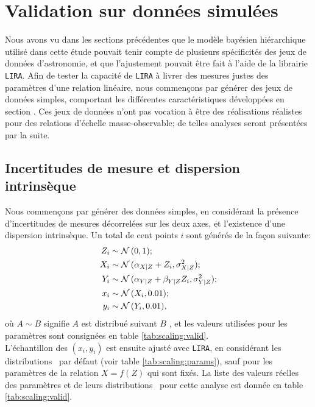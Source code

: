 \section{Validation sur données simulées}
\label{sec:scaling:valid}

Nous avons vu dans les sections précédentes que le modèle bayésien hiérarchique utilisé dans cette étude pouvait tenir compte de plusieurs spécificités des jeux de données d'astronomie, et que l'ajustement pouvait être fait à l'aide de la librairie \texttt{LIRA}.
Afin de tester la capacité de \texttt{LIRA} à livrer des mesures justes des paramètres d'une relation linéaire, nous commençons par générer des jeux de données simples, comportant les différentes caractéristiques développées en section .
Ces jeux de données n'ont pas vocation à être des réalisations réalistes pour des relations d'échelle masse-observable; de telles analyses seront présentées par la suite.

\subsection{Incertitudes de mesure et dispersion intrinsèque}
\label{sec:scaling:valid1}

Nous commençons par générer des données simples, en considérant la présence d'incertitudes de mesures décorrelées sur les deux axes, et l'existence d'une dispersion intrinsèque.
Un total de cent points $i$ sont générés de la façon suivante:
\begin{align}
    \nonumber Z_i &\sim \mathcal{N}\,(0, 1); \\
    \nonumber X_i &\sim \mathcal{N}\,(\alpha_{X|Z} + Z_i, \sigma_{X|Z}^2); \\
    \nonumber Y_i &\sim \mathcal{N}\,(\alpha_{Y|Z} + \beta_{Y|Z} Z_i, \sigma_{Y|Z}^2); \\
    \nonumber x_i &\sim \mathcal{N}\,(X_i, 0.01); \\
              y_i &\sim \mathcal{N}\,(Y_i, 0.01),
              \label{eq:scaling:sim_sample_valid}
\end{align}
où $A \sim B$ signifie \guillemotleft $A$ est distribué suivant $B$ \guillemotright, et les valeurs utilisées pour les paramètres sont consignées en table \ref{tab:scaling:valid}. \\
L'échantillon des $(x_i, y_i)$ est ensuite ajusté avec \texttt{LIRA}, en considérant les distributions \prior\ par défaut (voir table \ref{tab:scaling:params}), sauf pour les paramètres de la relation $X = f(Z)$ qui sont fixés.
La liste des valeurs réelles des paramètres et de leurs distributions \prior\ pour cette analyse est donnée en table \ref{tab:scaling:valid}.

